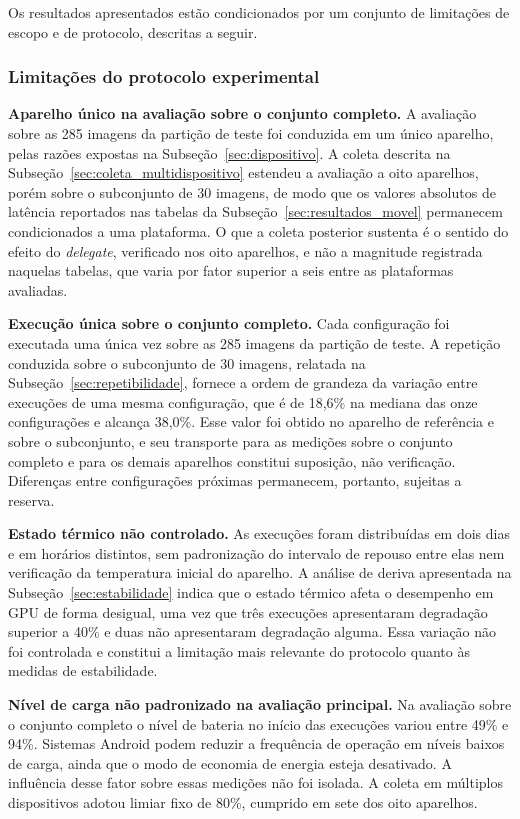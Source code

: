 \documentclass[artigo,times,capa]{iftex2024}
\begin{document}
Os resultados apresentados estão condicionados por um conjunto de limitações de escopo e de protocolo, descritas a seguir.

\subsubsection{Limitações do protocolo experimental}

\textbf{Aparelho único na avaliação sobre o conjunto completo.} A avaliação sobre as 285 imagens da partição de teste foi conduzida em um único aparelho, pelas razões expostas na Subseção~\ref{sec:dispositivo}. A coleta descrita na Subseção~\ref{sec:coleta_multidispositivo} estendeu a avaliação a oito aparelhos, porém sobre o subconjunto de 30 imagens, de modo que os valores absolutos de latência reportados nas tabelas da Subseção~\ref{sec:resultados_movel} permanecem condicionados a uma plataforma. O que a coleta posterior sustenta é o sentido do efeito do \textit{delegate}, verificado nos oito aparelhos, e não a magnitude registrada naquelas tabelas, que varia por fator superior a seis entre as plataformas avaliadas.

\textbf{Execução única sobre o conjunto completo.} Cada configuração foi executada uma única vez sobre as 285 imagens da partição de teste. A repetição conduzida sobre o subconjunto de 30 imagens, relatada na Subseção~\ref{sec:repetibilidade}, fornece a ordem de grandeza da variação entre execuções de uma mesma configuração, que é de 18,6\% na mediana das onze configurações e alcança 38,0\%. Esse valor foi obtido no aparelho de referência e sobre o subconjunto, e seu transporte para as medições sobre o conjunto completo e para os demais aparelhos constitui suposição, não verificação. Diferenças entre configurações próximas permanecem, portanto, sujeitas a reserva.

\textbf{Estado térmico não controlado.} As execuções foram distribuídas em dois dias e em horários distintos, sem padronização do intervalo de repouso entre elas nem verificação da temperatura inicial do aparelho. A análise de deriva apresentada na Subseção~\ref{sec:estabilidade} indica que o estado térmico afeta o desempenho em \ac{GPU} de forma desigual, uma vez que três execuções apresentaram degradação superior a 40\% e duas não apresentaram degradação alguma. Essa variação não foi controlada e constitui a limitação mais relevante do protocolo quanto às medidas de estabilidade.

\textbf{Nível de carga não padronizado na avaliação principal.} Na avaliação sobre o conjunto completo o nível de bateria no início das execuções variou entre 49\% e 94\%. Sistemas Android podem reduzir a frequência de operação em níveis baixos de carga, ainda que o modo de economia de energia esteja desativado. A influência desse fator sobre essas medições não foi isolada. A coleta em múltiplos dispositivos adotou limiar fixo de 80\%, cumprido em sete dos oito aparelhos.
\end{document}
